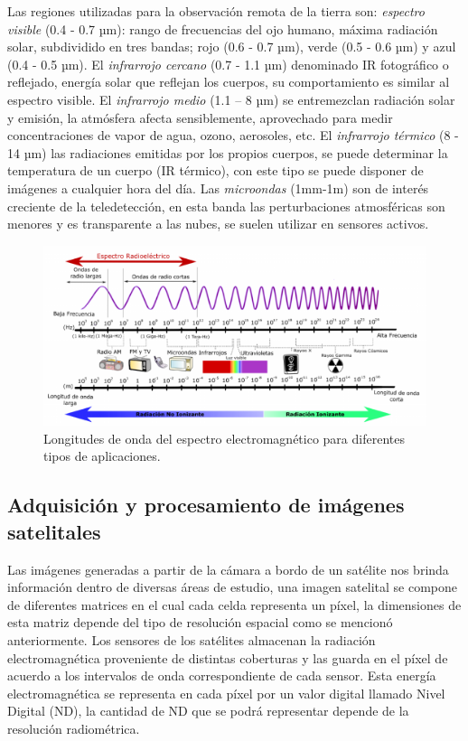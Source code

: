 Las regiones utilizadas para la observación remota de la tierra son: \textit{espectro visible} (0.4 - 0.7 µm): rango de frecuencias del ojo humano, máxima radiación solar, subdividido en tres bandas; rojo (0.6 - 0.7 µm), verde (0.5 - 0.6 µm) y azul (0.4 - 0.5 µm). El \textit{infrarrojo cercano} (0.7 - 1.1 µm) denominado IR fotográfico o reflejado, energía solar que reflejan los cuerpos, su comportamiento es similar al espectro visible. El \textit{infrarrojo medio} (1.1 – 8 µm) se entremezclan radiación solar y emisión, la atmósfera afecta sensiblemente, aprovechado para medir concentraciones de vapor de agua, ozono, aerosoles, etc. El \textit{infrarrojo térmico} (8 - 14 µm) las radiaciones emitidas por los propios cuerpos, se puede determinar la temperatura de un cuerpo (IR térmico), con este tipo se puede disponer de imágenes a cualquier hora del día. Las \textit{microondas} (1mm-1m) son de interés creciente de la teledetección, en esta banda las perturbaciones atmosféricas son menores y es transparente a las nubes, se suelen utilizar en sensores activos. 


\begin{figure}[H] \centering
  \includegraphics[scale=0.5,keepaspectratio=true,clip=true]{imagenes/MarcoTeorico/espectro-electro.png}
  \caption{Longitudes de onda del espectro electromagnético para diferentes tipos de aplicaciones.}\label{Fig:espectro-electromagnetico}
\end{figure}



\subsection{Adquisición y procesamiento de imágenes satelitales}\label{sub:imagen_satelital}

Las imágenes generadas a partir de la cámara a bordo de un satélite nos brinda información dentro de diversas áreas de estudio, una imagen satelital se compone de diferentes matrices en el cual cada celda representa un píxel, la dimensiones de esta matriz depende del tipo de resolución espacial como se mencionó anteriormente. Los sensores de los satélites almacenan la radiación electromagnética proveniente de distintas coberturas y las guarda en el píxel de acuerdo a los intervalos de onda correspondiente de cada sensor. Esta energía electromagnética se representa en cada píxel por un valor digital llamado Nivel Digital (ND), la cantidad de ND que se podrá representar depende de la resolución radiométrica.

